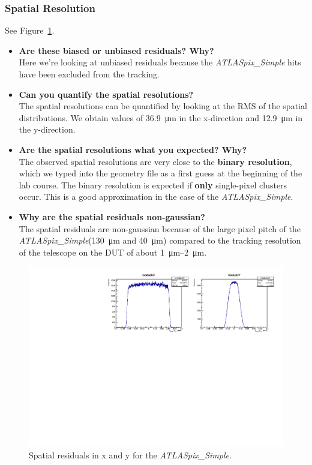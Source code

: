 \documentclass[a4paper,11pt]{article}
\newcommand*{\apx}{\emph{ATLASpix\_Simple}\xspace}
\begin{document}
\newpage
\subsubsection{Spatial Resolution}
See Figure~\ref{fig:10_spatialResiduals}.

\begin{itemize}
\item \textbf{Are these biased or unbiased residuals? Why?}\\
Here we're looking at unbiased residuals because the \apx hits have been excluded from the tracking.
\item \textbf{Can you quantify the spatial resolutions?} \\
The spatial resolutions can be quantified by looking at the RMS of the spatial distributions. 
We obtain values of \SI{36.9}{\micro m} in the x-direction and \SI{12.9}{\micro m} in the y-direction.
\item \textbf{Are the spatial resolutions what you expected? Why?}\\
The observed spatial resolutions are very close to the \textbf{binary resolution}, which we typed into the geometry file as a first guess at the beginning of the lab course.
The binary resolution is expected if \textbf{only} single-pixel clusters occur. 
This is a good approximation in the case of the \apx.
\item \textbf{Why are the spatial residuals non-gaussian?}\\
The spatial residuals are non-gaussian because of the large pixel pitch of the \apx (\SI{130}{\micro m} and \SI{40}{\micro m}) compared to the tracking resolution of the telescope on the DUT of about \SIrange{1}{2}{\micro m}.
\end{itemize}

\begin{figure}[!htb]
\centering
\includegraphics[width=\textwidth]{10_spatialResiduals}
\caption{Spatial residuals in x and y for the \apx.}
\label{fig:10_spatialResiduals}
\end{figure}
\end{document}

